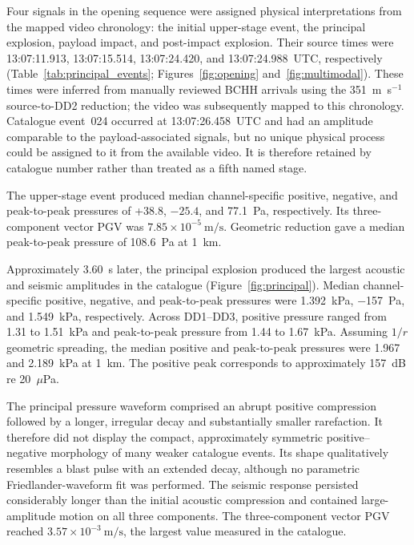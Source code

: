 \documentclass[]{seismica}
\begin{document}
Four signals in the opening sequence were assigned physical interpretations
from the mapped video chronology: the initial upper-stage event, the principal
explosion, payload impact, and post-impact explosion. Their source times were
13:07:11.913, 13:07:15.514, 13:07:24.420, and 13:07:24.988~UTC, respectively
(Table~\ref{tab:principal_events}; Figures~\ref{fig:opening}
and~\ref{fig:multimodal}). These times were inferred from manually reviewed
BCHH arrivals using the 351~m~s$^{-1}$ source-to-DD2 reduction; the video was
subsequently mapped to this chronology. Catalogue event~024 occurred at
13:07:26.458~UTC and had an amplitude comparable to the payload-associated
signals, but no unique physical process could be assigned to it from the
available video. It is therefore retained by catalogue number rather than
treated as a fifth named stage.

The upper-stage event produced median channel-specific positive, negative, and
peak-to-peak pressures of +38.8, $-25.4$, and 77.1~Pa, respectively. Its
three-component vector PGV was
$7.85\times10^{-5}\ \si{\metre\per\second}$. Geometric reduction gave a
median peak-to-peak pressure of 108.6~Pa at 1~km.

Approximately \SI{3.60}{\second} later, the principal explosion produced the
largest acoustic and seismic amplitudes in the catalogue
(Figure~\ref{fig:principal}). Median channel-specific positive, negative, and
peak-to-peak pressures were \SI{1.392}{\kilo\pascal},
\SI{-157}{\pascal}, and \SI{1.549}{\kilo\pascal}, respectively. Across
DD1--DD3, positive pressure ranged from 1.31 to 1.51~kPa and peak-to-peak
pressure from 1.44 to 1.67~kPa. Assuming $1/r$ geometric spreading, the median
positive and peak-to-peak pressures were 1.967 and 2.189~kPa at 1~km. The
positive peak corresponds to approximately 157~dB re 20~$\mu$Pa.

The principal pressure waveform comprised an abrupt positive compression
followed by a longer, irregular decay and substantially smaller rarefaction. It
therefore did not display the compact, approximately symmetric positive--negative
morphology of many weaker catalogue events. Its shape qualitatively resembles a
blast pulse with an extended decay, although no parametric Friedlander-waveform
fit was performed. The seismic response persisted considerably longer than the
initial acoustic compression and contained large-amplitude motion on all three
components. The three-component vector PGV reached
$3.57\times10^{-3}\ \si{\metre\per\second}$, the largest value measured in the
catalogue.
\end{document}
